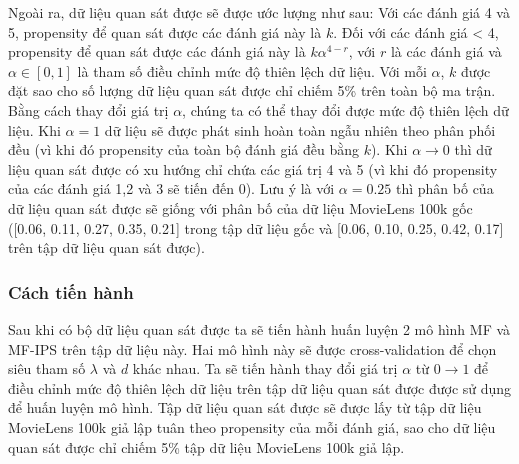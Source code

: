 Ngoài ra, dữ liệu quan sát được sẽ được ước lượng như sau: Với các đánh giá 4 và 5, propensity để quan sát được các đánh giá này là $k$. Đối với các đánh giá < 4, propensity để quan sát được các đánh giá này là $k\alpha^{4-r}$, với $r$ là các đánh giá và $\alpha \in [0,1]$ là tham số điều chỉnh mức độ thiên lệch dữ liệu. Với mỗi $\alpha$, $k$ được đặt sao cho số lượng dữ liệu quan sát được chỉ chiếm 5\% trên toàn bộ ma trận. Bằng cách thay đổi giá trị $\alpha$, chúng ta có thể thay đổi được mức độ thiên lệch dữ liệu. Khi $\alpha = 1$ dữ liệu sẽ được phát sinh hoàn toàn ngẫu nhiên theo phân phối đều (vì khi đó propensity của toàn bộ đánh giá đều bằng $k$). Khi $\alpha \rightarrow 0$ thì dữ liệu quan sát được có xu hướng chỉ chứa các giá trị 4 và 5 (vì khi đó propensity của các đánh giá 1,2 và 3 sẽ tiến đến 0). Lưu ý là với $\alpha = 0.25$ thì phân bố của dữ liệu quan sát được sẽ giống với phân bố của dữ liệu MovieLens 100k gốc ([0.06, 0.11, 0.27, 0.35, 0.21] trong tập dữ liệu gốc và [0.06, 0.10, 0.25, 0.42, 0.17] trên tập dữ liệu quan sát được).

\subsubsection{Cách tiến hành}
Sau khi có bộ dữ liệu quan sát được ta sẽ tiến hành huấn luyện 2 mô hình MF và MF-IPS trên tập dữ liệu này. Hai mô hình này sẽ được cross-validation để chọn siêu tham số $\lambda$ và $d$ khác nhau. Ta sẽ tiến hành thay đổi giá trị $\alpha$ từ $0 \rightarrow 1$ để điều chỉnh mức độ thiên lệch dữ liệu trên tập dữ liệu quan sát được được sử dụng để huấn luyện mô hình. Tập dữ liệu quan sát được sẽ được lấy từ tập dữ liệu MovieLens 100k giả lập tuân theo propensity của mỗi đánh giá, sao cho dữ liệu quan sát được chỉ chiếm 5\% tập dữ liệu MovieLens 100k giả lập.
